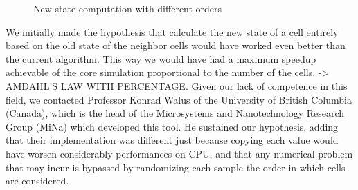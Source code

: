 \begin{figure}[h!tb]
	\caption{New state computation with different orders}
	\label{fig:cpu_alg}
\end{figure}
We initially made the hypothesis that calculate the new state of a cell entirely based on the old state of the neighbor cells would have worked even better than the current algorithm. This way we would have had a maximum speedup achievable of the core simulation proportional to the number of the cells.
-> AMDAHL'S LAW WITH PERCENTAGE.
Given our lack of competence in this field, we contacted Professor Konrad Walus of the University of British Columbia (Canada), which is the head of the Microsystems and Nanotechnology Research Group (MiNa) which developed this tool. He sustained our hypothesis, adding that their implementation was different just because copying each value would have worsen considerably performances on CPU, and that any numerical problem that may incur is bypassed by randomizing each sample the order in which cells are considered.\newline
